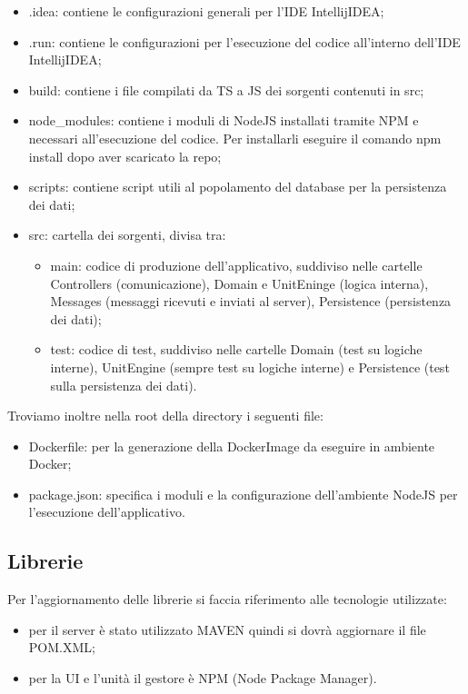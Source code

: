 	\begin{itemize}
		\item{.idea}: contiene le configurazioni generali per l'IDE IntellijIDEA;
		\item{.run}: contiene le configurazioni per l'esecuzione del codice all'interno dell'IDE IntellijIDEA;
		\item{build}: contiene i file compilati da TS a JS dei sorgenti contenuti in src;
		\item{node\_modules}: contiene i moduli di NodeJS installati tramite NPM e	necessari all'esecuzione del codice. Per installarli eseguire il comando npm install dopo aver scaricato la repo;
		\item{scripts}: contiene script utili al popolamento del database per la persistenza dei dati;
		\item{src}: cartella dei sorgenti, divisa tra:
		\begin{itemize}
			\item{main}: codice di produzione dell'applicativo, suddiviso nelle cartelle Controllers (comunicazione), Domain e UnitEninge (logica interna), Messages (messaggi ricevuti e inviati al server), Persistence (persistenza dei dati);
			\item{test}: codice di test, suddiviso nelle cartelle Domain (test su logiche interne),	UnitEngine (sempre test su logiche interne) e Persistence (test sulla persistenza dei dati).
		\end{itemize}
	\end{itemize}
	
	Troviamo inoltre nella root della directory i seguenti file:
	\begin{itemize}
		\item{Dockerfile}: per la generazione della DockerImage da eseguire in ambiente Docker;
		\item{package.json}: specifica i moduli e la configurazione dell'ambiente NodeJS per l'esecuzione dell'applicativo.
	\end{itemize}
	
\subsection{Librerie}
	Per l'aggiornamento delle librerie si faccia riferimento alle tecnologie utilizzate:
	\begin{itemize}
		\item{} per il server è stato utilizzato MAVEN quindi si dovrà aggiornare il file POM.XML;
		\item{} per la UI e l'unità il gestore è NPM (Node Package Manager).
	\end{itemize}
